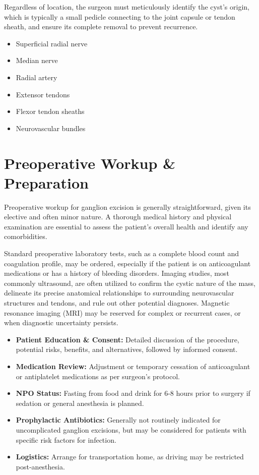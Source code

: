 Regardless of location, the surgeon must meticulously identify the cyst's origin, which is typically a small pedicle connecting to the joint capsule or tendon sheath, and ensure its complete removal to prevent recurrence.

\begin{itemize}
  \item Superficial radial nerve
  \item Median nerve
  \item Radial artery
  \item Extensor tendons
  \item Flexor tendon sheaths
  \item Neurovascular bundles
\end{itemize}

\section*{Preoperative Workup \& Preparation}
Preoperative workup for ganglion excision is generally straightforward, given its elective and often minor nature. A thorough medical history and physical examination are essential to assess the patient's overall health and identify any comorbidities. 

Standard preoperative laboratory tests, such as a complete blood count and coagulation profile, may be ordered, especially if the patient is on anticoagulant medications or has a history of bleeding disorders. Imaging studies, most commonly ultrasound, are often utilized to confirm the cystic nature of the mass, delineate its precise anatomical relationships to surrounding neurovascular structures and tendons, and rule out other potential diagnoses. Magnetic resonance imaging (MRI) may be reserved for complex or recurrent cases, or when diagnostic uncertainty persists.

\begin{itemize}
  \item \textbf{Patient Education \& Consent:} Detailed discussion of the procedure, potential risks, benefits, and alternatives, followed by informed consent.
  
  \item \textbf{Medication Review:} Adjustment or temporary cessation of anticoagulant or antiplatelet medications as per surgeon's protocol.
  
  \item \textbf{NPO Status:} Fasting from food and drink for 6-8 hours prior to surgery if sedation or general anesthesia is planned.
  
  \item \textbf{Prophylactic Antibiotics:} Generally not routinely indicated for uncomplicated ganglion excisions, but may be considered for patients with specific risk factors for infection.
  
  \item \textbf{Logistics:} Arrange for transportation home, as driving may be restricted post-anesthesia.
\end{itemize}

